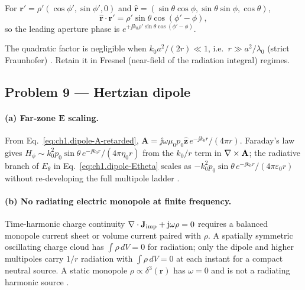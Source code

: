 For $\mathbf{r}'=\rho'(\cos\phi',\sin\phi',0)$ and $\hat{\mathbf{r}}=(\sin\theta\cos\phi,\sin\theta\sin\phi,\cos\theta)$,
\[
\hat{\mathbf{r}}\cdot\mathbf{r}'=\rho'\sin\theta\cos(\phi'-\phi),
\]
so the leading aperture phase is $e^{+\jj k_0\rho'\sin\theta\cos(\phi'-\phi)}$.

The quadratic factor is negligible when $k_0 a^2/(2r)\ll1$, i.e.\ $r\gg a^2/\lambda_0$ (strict Fraunhofer) \cite{bornwolf1999,silver1949}. Retain it in Fresnel (near-field of the radiation integral) regimes.

\subsection*{Problem 9 --- Hertzian dipole}

\paragraph{(a) Far-zone $\mathbf{E}$ scaling.}
From Eq.~\eqref{eq:ch1.dipole-A-retarded}, $\mathbf{A}=\jj\omega\mu_0 p_0\hat{\mathbf{z}}\,e^{-\jj k_0 r}/(4\pi r)$. Faraday's law gives $H_\phi\sim k_0^2 p_0\sin\theta\,e^{-\jj k_0 r}/(4\pi\eta_0 r)$ from the $k_0/r$ term in $\nabla\times\mathbf{A}$; the radiative branch of $E_\theta$ in Eq.~\eqref{eq:ch1.dipole-Etheta} scales as $-k_0^2 p_0\sin\theta\,e^{-\jj k_0 r}/(4\pi\varepsilon_0 r)$ without re-developing the full multipole ladder \cite{stratton1941,harrington2001}.

\paragraph{(b) No radiating electric monopole at finite frequency.}
Time-harmonic charge continuity $\nabla\cdot\mathbf{J}_{\mathrm{imp}}+\mathrm{j}\omega\rho=0$ requires a balanced monopole current sheet or volume current paired with $\rho$. A spatially symmetric oscillating charge cloud has $\int\rho\,dV=0$ for radiation; only the dipole and higher multipoles carry $1/r$ radiation with $\int\rho\,dV=0$ at each instant for a compact neutral source. A static monopole $\rho\propto\delta^{3}(\mathbf{r})$ has $\omega=0$ and is not a radiating harmonic source \cite{stratton1941,jackson1999}.

